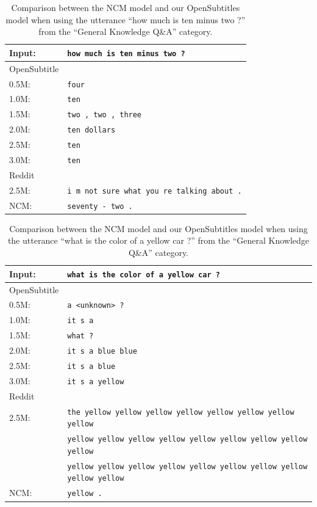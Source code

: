 \begin{table}[H]
	\centering
	\begin{adjustbox}{max width=\textwidth}
		\begin{tabular}{ll}
			\toprule
			Input: 	& \texttt{how much is ten minus two ?}\\
			\midrule
			OpenSubtitle\\
			0.5M: 	& \texttt{four}\\
			1.0M: 	& \texttt{ten}\\
			1.5M:	& \texttt{two , two , three}\\
			2.0M:	& \texttt{ten dollars}\\
			2.5M:	& \texttt{ten}\\
			3.0M:	& \texttt{ten}\\
			\midrule
			Reddit\\
			2.5M:	& \texttt{i m not sure what you re talking about .}\\
			\midrule
			NCM:	& \texttt{seventy - two .}\\
			\bottomrule
		\end{tabular}
	\end{adjustbox}
	\caption{Comparison between the NCM model and our OpenSubtitles model when using the utterance ``how much is ten minus two ?'' from the ``General Knowledge Q\&A'' category.}
	\label{results:example11_output:Neural_Conversational_Model_compared}
\end{table}
\begin{table}[H]
	\centering
	\begin{adjustbox}{max width=\textwidth}
		\begin{tabular}{ll}
			\toprule
			Input: 	& \texttt{what is the color of a yellow car ?}\\
			\midrule
			OpenSubtitle\\
			0.5M: 	& \texttt{a <unknown> ?}\\
			1.0M: 	& \texttt{it s a}\\
			1.5M:	& \texttt{what ?}\\
			2.0M:	& \texttt{it s a blue blue}\\
			2.5M:	& \texttt{it s a blue}\\
			3.0M:	& \texttt{it s a yellow}\\
			\midrule
			Reddit\\
			2.5M:	& \texttt{the yellow yellow yellow yellow yellow yellow yellow yellow}\\
					& \texttt{yellow yellow yellow yellow yellow yellow yellow yellow yellow}\\
					& \texttt{yellow yellow yellow yellow yellow yellow yellow yellow yellow yellow}\\
					\midrule
			NCM:	& \texttt{yellow .}\\
			\bottomrule
		\end{tabular}
	\end{adjustbox}
	\caption{Comparison between the NCM model and our OpenSubtitles model when using the utterance ``what is the color of a yellow car ?'' from the ``General Knowledge Q\&A'' category.}
	\label{results:example12_output:Neural_Conversational_Model_compared}
\end{table}
